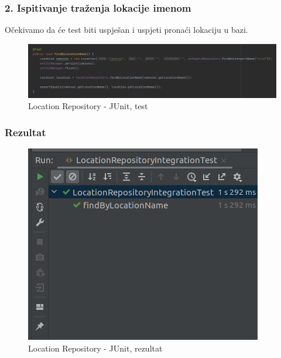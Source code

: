 				\subsubsection {2. Ispitivanje traženja lokacije imenom}
				
					{Očekivamo da će test biti uspješan i uspjeti pronaći lokaciju u bazi.}
				
						\begin{figure}[H]
							\includegraphics[width=\textwidth]{slike/locationFindByNameTest} 
							\centering
							\caption{Location Repository - JUnit, test}
							\label{}
						\end{figure}
					
				\subsubsection{Rezultat}
				
						\begin{figure}[H]
							\includegraphics[width=\textwidth]{slike/locationFindByNameTest_result} 
							\centering
							\caption{Location Repository - JUnit, rezultat}
							\label{}
						\end{figure}
					
